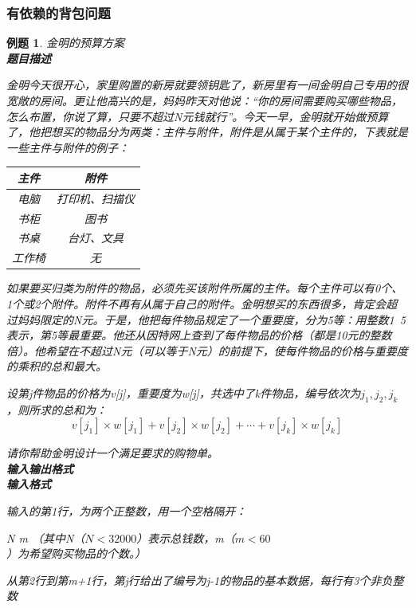 \documentclass{article}
\newtheorem{example}{例题}[subsection]
\theoremstyle{nonumberplain}
\begin{document}
\subsubsection{有依赖的背包问题}
\begin{example}金明的预算方案\\
	\textbf{题目描述}

	金明今天很开心，家里购置的新房就要领钥匙了，新房里有一间金明自己专用的很宽敞的房间。更让他高兴的是，妈妈昨天对他说：“你的房间需要购买哪些物品，怎么布置，你说了算，只要不超过N元钱就行”。今天一早，金明就开始做预算了，他把想买的物品分为两类：主件与附件，附件是从属于某个主件的，下表就是一些主件与附件的例子：
	\begin{center}
		\begin{tabular}{|c|c|}
			\hline
			主件   & 附件           \\
			\hline
			电脑   & 打印机、扫描仪 \\
			\hline
			书柜   & 图书           \\
			\hline
			书桌   & 台灯、文具     \\
			\hline
			工作椅 & 无             \\
			\hline
		\end{tabular}
	\end{center}

	如果要买归类为附件的物品，必须先买该附件所属的主件。每个主件可以有0个、1个或2个附件。附件不再有从属于自己的附件。金明想买的东西很多，肯定会超过妈妈限定的N元。于是，他把每件物品规定了一个重要度，分为5等：用整数1~5表示，第5等最重要。他还从因特网上查到了每件物品的价格（都是10元的整数倍）。他希望在不超过N元（可以等于N元）的前提下，使每件物品的价格与重要度的乘积的总和最大。

	设第j件物品的价格为v[j]，重要度为w[j]，共选中了k件物品，编号依次为$j_1,j_2,j_k$，则所求的总和为：
	\begin{equation*}
		v[j_1]\times w[j_1]+v[j_2]\times w[j_2]+ \cdots +v[j_k]\times w[j_k]
	\end{equation*}

	请你帮助金明设计一个满足要求的购物单。\\
	\textbf{输入输出格式}\\
	\textbf{输入格式}

	输入的第1行，为两个正整数，用一个空格隔开：

	N m （其中N（$N<32000$）表示总钱数，m（$m<60$）为希望购买物品的个数。）

	从第2行到第m+1行，第j行给出了编号为j-1的物品的基本数据，每行有3个非负整数


\end{example}
\end{document}
